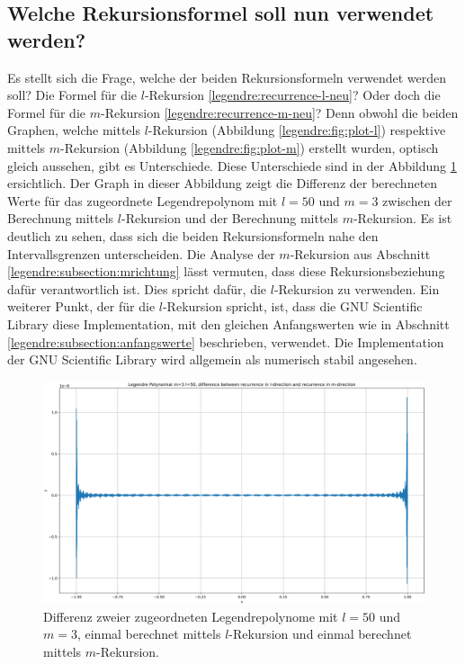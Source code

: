 \subsection{Welche Rekursionsformel soll nun verwendet werden?
\label{legendre:subsection:welche}}
Es stellt sich die Frage, welche der beiden Rekursionsformeln verwendet werden soll?
Die Formel für die $l$-Rekursion \eqref{legendre:recurrence-l-neu}?
Oder doch die Formel für die $m$-Rekursion \eqref{legendre:recurrence-m-neu}?
Denn obwohl die beiden Graphen, welche mittels $l$-Rekursion (Abbildung \ref{legendre:fig:plot-l}) respektive mittels $m$-Rekursion (Abbildung \ref{legendre:fig:plot-m}) erstellt wurden, optisch gleich aussehen, gibt es Unterschiede.
Diese Unterschiede sind in der Abbildung \ref{legendre:fig:plot-diff} ersichtlich.
Der Graph in dieser Abbildung zeigt die Differenz der berechneten Werte für das zugeordnete Legendrepolynom mit $l=50$ und $m=3$ zwischen der Berechnung mittels $l$-Rekursion und der Berechnung mittels $m$-Rekursion.
Es ist deutlich zu sehen, dass sich die beiden Rekursionsformeln nahe den Intervallsgrenzen unterscheiden.
Die Analyse der $m$-Rekursion aus Abschnitt \ref{legendre:subsection:mrichtung} lässt vermuten, dass diese Rekursionsbeziehung dafür verantwortlich ist.
Dies spricht dafür, die $l$-Rekursion zu verwenden.
Ein weiterer Punkt, der für die $l$-Rekursion spricht, ist, dass die GNU Scientific Library \cite{legendre:gsl} diese Implementation, mit den gleichen Anfangswerten wie in Abschnitt \ref{legendre:subsection:anfangswerte} beschrieben, verwendet.
Die Implementation der GNU Scientific Library wird allgemein als numerisch stabil angesehen.
\begin{figure}[!ht]
\centering
\includegraphics[width=1.0\linewidth]{papers/legendre/plots/plot_diff_l_m_small.png}
\caption{Differenz zweier zugeordneten Legendrepolynome mit \texorpdfstring{$l=50$}{l=50} und \texorpdfstring{$m=3$}{m=3}, einmal berechnet mittels \texorpdfstring{$l$}{l}-Rekursion und einmal berechnet mittels \texorpdfstring{$m$}{m}-Rekursion.}
\label{legendre:fig:plot-diff}
\end{figure}

